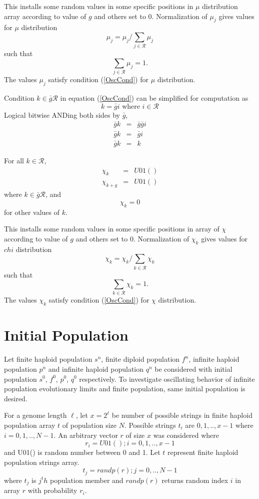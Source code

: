 This installs some random values in some specific positions in $\mu$ distribution array according to value of $g$ and others set to $0$. 
Normalization of $\mu_j$ gives values for $\mu$ distribution
\[
\mu_j = \mu_j / \sum \limits_{j \in \mathcal{R} } \mu_j
\]
such that 
\[
\sum \limits_{j \in \mathcal{R} } \mu_j = 1.
\]
The values $\mu_j$ satisfy condition (\ref{OscCond}) for $\mu$ distribution.


Condition $k \in \bar{g} \mathcal{R}$ in equation (\ref{OscCond}) can be simplified for computation as
\[
k = \bar{g} i  \text{ where $i \in \mathcal{R}$}
\]
Logical bitwise ANDing both sides by $\bar{g}$,
\begin{eqnarray*}
\bar{g} k & = & \bar{g} \bar{g} i \\
\bar{g} k & = & \bar{g} i \\
\bar{g} k & = & k 
\end{eqnarray*}

For all $k \in \mathcal{R}$,
\begin{eqnarray*}
\chi_k & = & U01() \\
\chi_{k+g} & = & U01() 
\end{eqnarray*}
where $k \in \bar{g} \mathcal{R}$, and
\[
\chi_k = 0
\]
for other values of $k$. \newline

This installs some random values in some specific positions in array of $\chi$ according to value of $g$ and others set to $0$. Normalization of $\chi_k$ gives values for $chi$ distribution 
\[
\chi_k = \chi_k/\sum\limits_{k \in \mathcal{R}} \chi_k
\]
such that 
\[
\sum\limits_{k \in \mathcal{R}} \chi_k = 1.
\]
The values $\chi_k$ satisfy condition (\ref{OscCond}) for $\chi$ distribution.

\section{Initial Population}
Let finite haploid population $s^n$, finite diploid population $f^n$, infinite haploid population $p^n$ and infinite haploid population $q^n$ be considered with initial population $s^0$, $f^0$,
$p^0$, $q^0$ respectively. To investigate oscillating behavior of infinite population evolutionary limits and finite population, same initial population is desired. 

For a genome length $\ell$, let $x = 2^\ell$ be number of possible strings in finite haploid population array $t$ of population size $N$. Possible strings $t_i$ are ${0, 1,.., x-1}$ where $i = 0, 1,.., N-1$. An arbitrary vector $r$ of size $x$ was considered where
\[
r_i = U01(); {i = 0, 1,.., x-1}
\]
and U01() is random number between 0 and 1.
Let $t$ represent finite haploid population strings array.
\[
t_j = randp(r) ; {j = 0,.., N-1}
\]
where $t_j$ is $j^th$ population member and $randp(r)$ returns random index $i$ in array $r$ with probability $r_i$.

